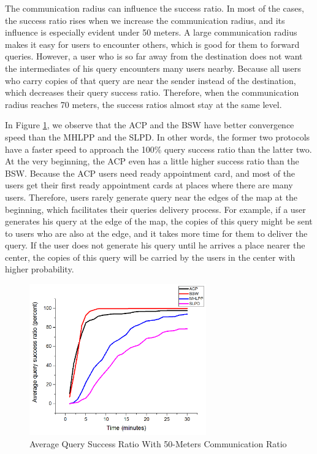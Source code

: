 \documentclass[conference]{IEEEtran}
\begin{document}
The communication radius can influence the success ratio. In most of the cases, the success ratio rises when we increase the communication radius, and its influence is especially evident under 50 meters. A large communication radius makes it easy for users to encounter others, which is good for them to forward queries. However, a user who is so far away from the destination does not want the intermediates of his query encounters many users nearby. Because all users who carry copies of that query are near the sender instead of the destination, which decreases their query success ratio. Therefore, when the communication radius reaches 70 meters, the success ratios almost stay at the same level.

In Figure \ref{fig:F416AverageQuerySuccessRatioWith50MetersCommunicationRatio}, we observe that the ACP and the BSW have better convergence speed than the MHLPP and the SLPD. In other words, the former two protocols have a faster speed to approach the 100\% query success ratio than the latter two. At the very beginning, the ACP even has a little higher success ratio than the BSW. Because the ACP users need ready appointment card, and most of the users get their first ready appointment cards at places where there are many users. Therefore, users rarely generate query near the edges of the map at the beginning, which facilitates their queries delivery process. For example, if a user generates his query at the edge of the map, the copies of this query might be sent to users who are also at the edge, and it takes more time for them to deliver the query. If the user does not generate his query until he arrives a place nearer the center, the copies of this query will be carried by the users in the center with higher probability.

\begin{figure} [hbtp]
  \centering 
  \includegraphics[width=3in]{figures/F416AverageQuerySuccessRatioWith50MetersCommunicationRatio.png}
  \caption{Average Query Success Ratio With 50-Meters Communication Ratio} 
  \label{fig:F416AverageQuerySuccessRatioWith50MetersCommunicationRatio} %
\end{figure}
\end{document}
